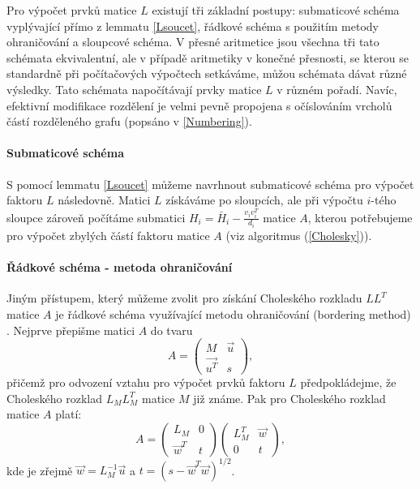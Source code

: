 \documentclass[11pt,american,czech,oneside]{book}
\theoremstyle{plain}
\theoremstyle{definition}
\begin{document}
Pro výpočet prvků matice $L$ existují tři základní postupy: submaticové schéma vyplývající přímo z lemmatu \ref{Lsoucet}, řádkové schéma s použitím metody ohraničování a sloupcové schéma. V přesné aritmetice jsou všechna tři tato schémata ekvivalentní, ale v případě aritmetiky v konečné přesnosti, se kterou se standardně při počítačových výpočtech setkáváme, můžou schémata dávat různé výsledky. Tato schémata napočítávají prvky matice $L$ v různém pořadí. Navíc, efektivní modifikace rozdělení je velmi pevně propojena s očíslováním vrcholů částí rozděleného grafu (popsáno v \ref{Numbering}).

\paragraph{Submaticové schéma}
S pomocí lemmatu \ref{Lsoucet} můžeme navrhnout submaticové schéma pro výpočet faktoru $L$ následovně. Matici $L$ získáváme po sloupcích, ale při výpočtu $i$-tého sloupce zároveň počítáme submatici $H_i = \bar{H}_i-\frac{v_i v_i^T}{d_i}$ matice $A$, kterou potřebujeme pro výpočet zbylých částí faktoru matice $A$ (viz algoritmus (\ref{Cholesky})).

\paragraph{Řádkové schéma - metoda ohraničování}
Jiným přístupem, který můžeme zvolit pro získání Choleského rozkladu $L L^T$ matice $A$ je řádkové schéma využívající metodu ohraničování (bordering method) \cite{fad:59, ort:88}. Nejprve přepišme matici $A$ do tvaru
\[
A =
\begin{pmatrix}
  M & \vec{u} \\
  \vec{u^T} & s
\end{pmatrix},
\]
přičemž pro odvození vztahu pro výpočet prvků faktoru $L$ předpokládejme, že Choleského rozklad $L_M L_M^T$ matice $M$ již známe. Pak pro Choleského rozklad matice $A$ platí:
\[
A =
\begin{pmatrix}
  L_M & 0 \\
  \vec{w}^T & t
\end{pmatrix}
\begin{pmatrix}
  L_M^T & \vec{w} \\
  0 & t
\end{pmatrix},
\]
kde je zřejmě $\vec{w}=L_M^{-1}\vec{u}$ a $t=(s-\vec{w}^T\vec{w})^{1/2}$.
\end{document}
